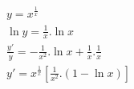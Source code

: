 \begin{ex}
\begin{align}
&y=x^{\frac{1}{x}}\nonumber\\
&\ln{y}=\frac{1}{x}.\ln{x}\nonumber\\
&\frac{y'}{y}=-\frac{1}{x^2}.\ln{x}+\frac{1}{x}.\frac{1}{x}\nonumber\\
&y'=x^{\frac{1}{x}}\left[\frac{1}{x^2}.(1-\ln{x})\right]\nonumber
\end{align}
\end{ex}